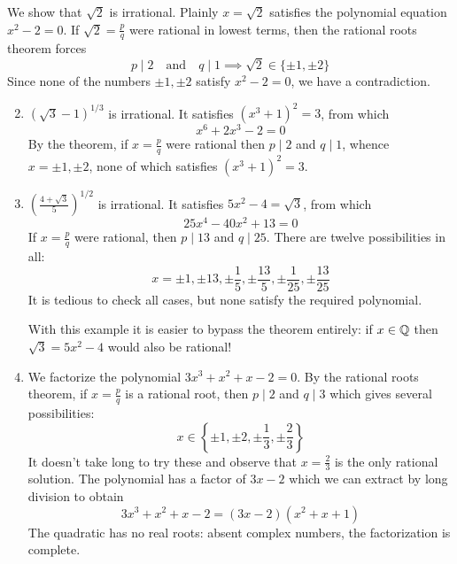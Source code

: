 \goodbreak

\begin{examples}{}{}
	\exstart We show that $\sqrt 2$ is irrational.\footnotemark{} Plainly $x=\sqrt 2$ satisfies the polynomial equation $x^2-2=0$. If $\sqrt 2=\frac pq$ were rational in lowest terms, then the rational roots theorem forces
	  \[p\mid 2\quad\text{and}\quad q\mid 1\implies \sqrt 2\in\{\pm 1,\pm 2\}\]
	  Since none of the numbers $\pm 1,\pm 2$ satisfy $x^2-2=0$, we have a contradiction.

	\begin{enumerate}\setcounter{enumi}{1}
		\item $(\sqrt 3-1)^{1/3}$ is irrational. It satisfies $(x^3+1)^2=3$, from which
		\[x^6+2x^3-2=0\]
		By the theorem, if $x=\frac pq$ were rational then $p\mid 2$ and $q\mid 1$, whence $x=\pm 1,\pm 2$, none of which satisfies $(x^3+1)^2=3$.
		\item $\left(\frac{4+\sqrt 3}{5}\right)^{1/2}$ is irrational. It satisfies $5x^2-4=\sqrt 3$, from which
		\[25x^4-40x^2+13=0\]
		If $x=\frac pq$ were rational, then $p\mid 13$ and $q\mid 25$. There are twelve possibilities in all:
		\[x=\pm 1,\pm 13,\pm\frac 15,\pm\frac{13}5,\pm\frac 1{25},\pm\frac{13}{25}\]
		It is tedious to check all cases, but none satisfy the required polynomial.
		\par
		With this example it is easier to bypass the theorem entirely: if $x\in\mathbb{Q}$ then $\sqrt 3=5x^2-4$ would also be rational!
		
		\item We factorize the polynomial $3x^3+x^2+x-2=0$. By the rational roots theorem, if $x=\frac pq$ is a rational root, then $p\mid 2$ and $q\mid 3$ which gives several possibilities:
		\[x\in\left\{\pm 1,\pm 2,\pm\frac 13,\pm\frac 23\right\}\]
		It doesn't take long to try these and observe that $x=\frac 23$ is the only rational solution. The polynomial has a factor of $3x-2$ which we can extract by long division to obtain
		\[3x^3+x^2+x-2=(3x-2)(x^2+x+1)\]
		The quadratic has no real roots: absent complex numbers, the factorization is complete.
	\end{enumerate}
\end{examples}




